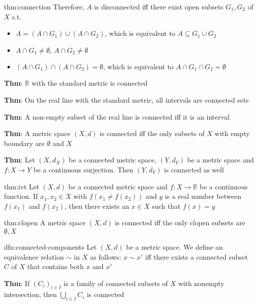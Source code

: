 \documentclass[landscape, 8pt]{extarticle}
\begin{document}
\begin{multicols}{3}
\begin{thm}{thm:connection}{}
    Therefore, $A$ is disconnected iff there exist open subsets $G_{1}, G_{2}$ of $X$ s.t.
    \begin{itemize}[leftmargin=*]
        \item $A = (A \cap G_{1}) \cup (A \cap G_{2})$, which is equivalent to $A \subseteq G_{1} \cup G_{2}$
        \item $A \cap G_{1} \ne \emptyset,\, A \cap G_{2}\ne \emptyset$
        \item $(A \cap G_{1}) \cap (A \cap G_{2}) = \emptyset$, which is equivalent to $A \cap G_{1} \cap G_{2} = \emptyset$
    \end{itemize}

    \longrule{0.08ex}
    \textbf{Thm}: $\mathbb{R}$ with the standard metric is connected

    \textbf{Thm}: On the real line with the standard metric, all intervals are connected sets

    \textbf{Thm}: A non-empty subset of the real line is connected iff it is an interval

    \textbf{Thm}: A metric space $(X, d)$ is connected iff the only subsets of $X$ with empty boundary are $\emptyset$ and $X$

    \textbf{Thm}: Let $(X, d_{X})$ be a connected metric space, $(Y, d_{Y})$ be a metric space and $f : X \to Y$ be a continuous surjection. Then $(Y, d_{Y})$ is connected as well
\end{thm}

\begin{thm}{thm:ivt}{}
    Let $(X, d)$ be a connected metric space and $f : X \to \mathbb{R}$ be a continuous function. If $x_{1}, x_{2}\in X$ with $f(x_{1} \ne f(x_{2}))$ and $y$ is a real number between $f(x_{1})$ and $f(x_{2})$, then there exists an $x\in X$ such that $f(x) = y$
\end{thm}

\begin{thm}[Clopen]{thm:clopen}{}
    A metric space $(X, d)$ is connected iff the only clopen subsets are $\emptyset, X$
\end{thm}

\begin{dfn}{dfn:connected-components}{}
    Let $(X, d)$ be a metric space. We define an equivalence relation $\sim$ in $X$ as follows: $x \sim x'$ iff there exists a connected subset $C$ of $X$ that contains both $x$ and $x'$

    \textbf{Thm}: If $(C_{i})_{i\in I}$ is a family of connected subsets of $X$ with nonempty intersection, then $\bigcup_{i\in I} C_{i}$ is connected
\end{dfn}


\end{multicols}
\end{document}
